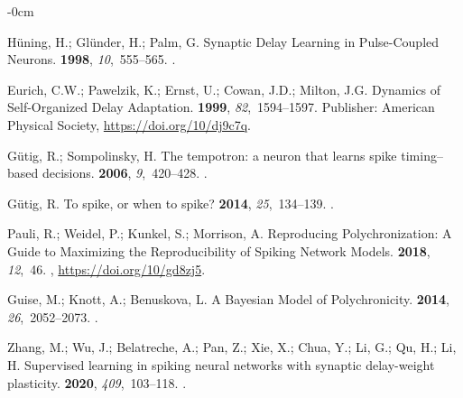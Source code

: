\documentclass[brainsci, %
               review,submit,pdftex,moreauthors
               ]{Definitions/mdpi}
\begin{document}
\begin{adjustwidth}{-\extralength}{0cm}
\begin{thebibliography}{999}
  Hüning, H.; Glünder, H.; Palm, G.
  \newblock Synaptic {Delay} {Learning} in {Pulse}-{Coupled} {Neurons}.
   {\bf 1998}, {\em 10},~555--565.
  .
  
  Eurich, C.W.; Pawelzik, K.; Ernst, U.; Cowan, J.D.; Milton, J.G.
  \newblock Dynamics of {Self}-{Organized} {Delay} {Adaptation}.
   {\bf 1999}, {\em 82},~1594--1597.
   Publisher: American Physical Society,
    {\url{https://doi.org/10/dj9c7q}}.
  
  Gütig, R.; Sompolinsky, H.
  \newblock The tempotron: a neuron that learns spike timing–based decisions.
   {\bf 2006}, {\em 9},~420--428.
  .
  
  Gütig, R.
  \newblock To spike, or when to spike?
   {\bf 2014}, {\em 25},~134--139.
  .
  
  Pauli, R.; Weidel, P.; Kunkel, S.; Morrison, A.
  \newblock Reproducing {Polychronization}: {A} {Guide} to {Maximizing} the
    {Reproducibility} of {Spiking} {Network} {Models}.
   {\bf 2018}, {\em 12},~46.
  , {\url{https://doi.org/10/gd8zj5}}.
  
  Guise, M.; Knott, A.; Benuskova, L.
  \newblock A {Bayesian} {Model} of {Polychronicity}.
   {\bf 2014}, {\em 26},~2052--2073.
  .
  
  Zhang, M.; Wu, J.; Belatreche, A.; Pan, Z.; Xie, X.; Chua, Y.; Li, G.; Qu, H.;
    Li, H.
  \newblock Supervised learning in spiking neural networks with synaptic
    delay-weight plasticity.
   {\bf 2020}, {\em 409},~103--118.
  .
  

\end{thebibliography}
\end{adjustwidth}
\end{document}
